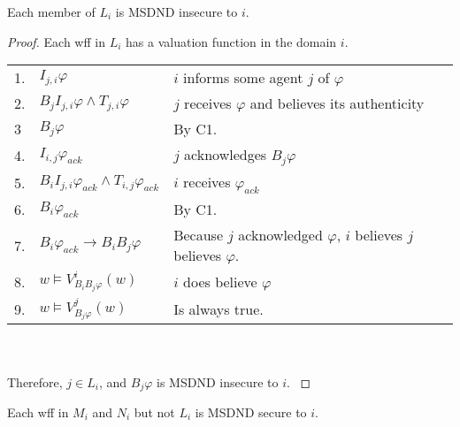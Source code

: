 \begin{thm}
Each member of $L_i$ is MSDND insecure to $i$.
\end{thm}

\begin{proof}
Each wff in $L_i$ has a valuation function in the domain $i$.

\begin{table}[H]
\centering
\small
\begin{tabularx}{\linewidth}{l l X}
1. & $I_{j,i} \varphi$ & $i$ informs some agent $j$ of $\varphi$ \\
2. & $B_{j}I_{j,i} \varphi \wedge T_{j,i} \varphi$ & $j$ receives $\varphi$ and believes its authenticity \\
3  & $B_j \varphi$ & By C1. \\
4. & $I_{i,j} \varphi_{ack}$ & $j$ acknowledges $B_j \varphi$ \\
5. & $B_{i}I_{j,i} \varphi_{ack} \wedge T_{i,j} \varphi_{ack}$ & $i$ receives $\varphi_{ack}$ \\
6. & $B_{i} \varphi_{ack}$ & By C1. \\
7. & $B_{i} \varphi_{ack} \rightarrow B_i B_j \varphi$ & Because $j$ acknowledged $\varphi$, $i$ believes $j$ believes $\varphi$. \\
8. & $w \vDash V_{B_i B_j \varphi}^{i}(w)$ & $i$ does believe $\varphi$ \\
9. & $w \vDash V_{B_j \varphi}^{j}(w)$ & Is always true. %
\end{tabularx} \\~\\
Therefore, $j \in L_i$, and $B_j \varphi$ is MSDND insecure to $i$.
\label{tab:lsetsecurity}
\end{table}
\end{proof}

\begin{thm}
Each wff in $M_i$ and $N_i$ but not $L_i$ is MSDND secure to $i$.
\end{thm}

